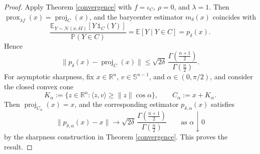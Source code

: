 \documentclass[11pt]{article}
\newcommand{\1}{\mathds{1}}
\theoremstyle{definition}
\theoremstyle{remark}
\theoremstyle{definition}
\begin{document}
\begin{proof}
Apply Theorem \ref{convergence} with \(f=\iota_C\), \(\rho=0\), and
\(\lambda=1\). Then \(\operatorname{prox}_{\lambda f}(x)=\operatorname{proj}_C(x)\),
and the barycenter estimator \(m_\delta(x)\) coincides with
\[
\frac{\mathbb E_{Y\sim\mathcal N(x,\delta I)}[Y\,\1_C(Y)]}
{\mathbb P(Y\in C)}
=
\mathbb E[Y\mid Y\in C]
=
p_\delta(x).
\]
Hence
\[
\|p_\delta(x)-\operatorname{proj}_C(x)\|
\le
\sqrt{2\delta}\,
\frac{\Gamma\!\left(\frac{n+1}{2}\right)}
{\Gamma\!\left(\frac{n}{2}\right)}.
\]
For asymptotic sharpness, fix \(x\in\mathbb{R}^n\), \(v\in\mathbb S^{n-1}\),
and \(\alpha\in(0,\pi/2)\), and consider the closed convex cone
\[
K_\alpha:=\{z\in\mathbb R^n:\langle z,v\rangle\ge \|z\|\cos\alpha\},
\qquad
C_\alpha:=x+K_\alpha.
\]
Then \(\operatorname{proj}_{C_\alpha}(x)=x\), and the corresponding estimator
\(p_{\delta,\alpha}(x)\) satisfies
\[
\|p_{\delta,\alpha}(x)-x\|
\longrightarrow
\sqrt{2\delta}\,
\frac{\Gamma\!\left(\frac{n+1}{2}\right)}
{\Gamma\!\left(\frac{n}{2}\right)}
\qquad\text{as }\alpha\downarrow 0
\]
by the sharpness construction in Theorem \ref{convergence}. This proves the result.
\end{proof}
\end{document}
